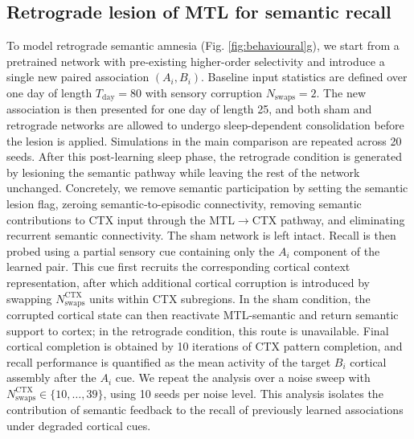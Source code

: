 \documentclass{article}
\begin{document}
\subsection*{Retrograde lesion of MTL for semantic recall}
To model retrograde semantic amnesia (Fig. \ref{fig:behavioural}g), we start from a pretrained network with pre-existing higher-order selectivity and introduce a single new paired association $(A_i,B_i)$. Baseline input statistics are defined over one day of length $T_\mathrm{day}=80$ with sensory corruption $N_\mathrm{swaps}=2$. The new association is then presented for one day of length 25, and both sham and retrograde networks are allowed to undergo sleep-dependent consolidation before the lesion is applied. Simulations in the main comparison are repeated across 20 seeds.
\newline\newline
After this post-learning sleep phase, the retrograde condition is generated by lesioning the semantic pathway while leaving the rest of the network unchanged. Concretely, we remove semantic participation by setting the semantic lesion flag, zeroing semantic-to-episodic connectivity, removing semantic contributions to CTX input through the MTL$\rightarrow$CTX pathway, and eliminating recurrent semantic connectivity. The sham network is left intact.
\newline\newline
Recall is then probed using a partial sensory cue containing only the $A_i$ component of the learned pair. This cue first recruits the corresponding cortical context representation, after which additional cortical corruption is introduced by swapping $N_\mathrm{swaps}^{\mathrm{CTX}}$ units within CTX subregions. In the sham condition, the corrupted cortical state can then reactivate MTL-semantic and return semantic support to cortex; in the retrograde condition, this route is unavailable. Final cortical completion is obtained by 10 iterations of CTX pattern completion, and recall performance is quantified as the mean activity of the target $B_i$ cortical assembly after the $A_i$ cue.
\newline\newline
We repeat the analysis over a noise sweep with $N_\mathrm{swaps}^{\mathrm{CTX}}\in\{10,\dots,39\}$, using 10 seeds per noise level. This analysis isolates the contribution of semantic feedback to the recall of previously learned associations under degraded cortical cues.
\end{document}
